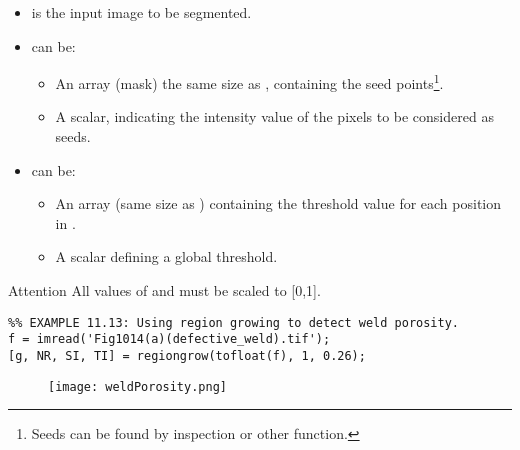 %

\begin{frame}[fragile]
\begin{itemize}
\item {} is the input  image to be segmented.
\item {} can be:
\begin{itemize}
\item An array (mask) the same size as , containing the seed points\footnote{Seeds can be found by inspection or other function.}.
\item A scalar, indicating the intensity value of the pixels to be considered as seeds.
\end{itemize}
\item {} can be:
\begin{itemize}
\item An array (same size as ) containing the threshold value for each position in .
\item A scalar defining a global threshold.
\end{itemize}
\end{itemize}
\begin{block}{Attention}
All values of  and  must be scaled to [0,1].
\end{block}
\end{frame}

\begin{frame}[fragile]
\begin{lstlisting}
%% EXAMPLE 11.13: Using region growing to detect weld porosity.
f = imread('Fig1014(a)(defective_weld).tif');
[g, NR, SI, TI] = regiongrow(tofloat(f), 1, 0.26);
\end{lstlisting}
\begin{figure}[!h]
\centering
\texttt{[image: weldPorosity.png]}
\end{figure}
\end{frame}

